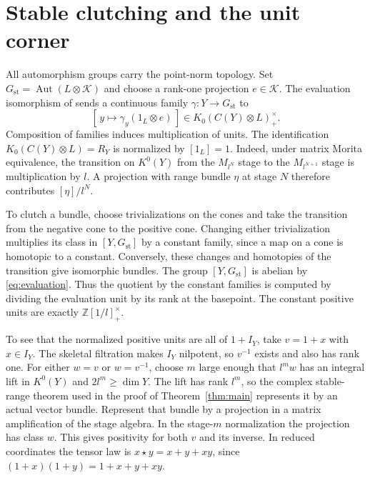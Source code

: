 \documentclass[11pt]{article}
\DeclareMathOperator{\Aut}{Aut}
\newcommand{\K}{\mathcal K}
\newcommand{\Z}{\mathbb Z}
\newcommand{\RY}{R_Y}
\newcommand{\IY}{I_Y}
\begin{document}
\section{Stable clutching and the unit corner}\label{sec:clutching}

All automorphism groups carry the point-norm topology. Set \(G_{\mathrm{st}}=\Aut(L\otimes\K)\) and choose a rank-one projection \(e\in\K\). The evaluation isomorphism of \cite[Theorem 2.22]{DP1} sends a continuous family \(\gamma:Y\to G_{\mathrm{st}}\) to
\begin{equation}\label{eq:evaluation}
    [\,y\longmapsto\gamma_y(1_L\otimes e)\,]
       \in K_0(C(Y)\otimes L)^\times_+ .
\end{equation}
Composition of families induces multiplication of units. The identification \(K_0(C(Y)\otimes L)=\RY\) is normalized by \([1_L]=1\). Indeed, under matrix Morita equivalence, the transition on \(K^0(Y)\) from the \(M_{l^N}\) stage to the \(M_{l^{N+1}}\) stage is multiplication by \(l\). A projection with range bundle \(\eta\) at stage \(N\) therefore contributes \([\eta]/l^N\).

To clutch a bundle, choose trivializations on the cones and take the transition from the negative cone to the positive cone. Changing either trivialization multiplies its class in \([Y,G_{\mathrm{st}}]\) by a constant family, since a map on a cone is homotopic to a constant. Conversely, these changes and homotopies of the transition give isomorphic bundles. The group \([Y,G_{\mathrm{st}}]\) is abelian by \eqref{eq:evaluation}. Thus the quotient by the constant families is computed by dividing the evaluation unit by its rank at the basepoint. The constant positive units are exactly \(\Z[1/l]^\times_+\).

To see that the normalized positive units are all of \(1+\IY\), take \(v=1+x\) with \(x\in\IY\). The skeletal filtration makes \(\IY\) nilpotent, so \(v^{-1}\) exists and also has rank one. For either \(w=v\) or \(w=v^{-1}\), choose \(m\) large enough that \(l^mw\) has an integral lift in \(K^0(Y)\) and \(2l^m\geq\dim Y\). The lift has rank \(l^m\), so the complex stable-range theorem used in the proof of Theorem~\ref{thm:main} represents it by an actual vector bundle. Represent that bundle by a projection in a matrix amplification of the stage algebra. In the stage-\(m\) normalization the projection has class \(w\). This gives positivity for both \(v\) and its inverse. In reduced coordinates the tensor law is \(x\star y=x+y+xy\), since \((1+x)(1+y)=1+x+y+xy\).
\end{document}
